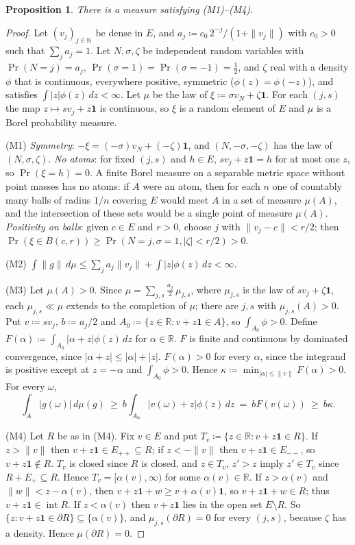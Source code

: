 \documentclass[11pt]{article}
\newtheorem{proposition}[theorem]{Proposition}
\theoremstyle{definition}
\newcommand{\one}{\mathbf 1}
\newcommand{\R}{\mathbb R}
\newcommand{\N}{\mathbb N}
\newcommand{\interior}{\operatorname{int}}
\newcommand{\bd}{\partial}
\begin{document}
\begin{proposition}\label{prop:existence-measure}
There is a measure satisfying (M1)--(M4).
\end{proposition}
\begin{proof}
Let $(v_j)_{j\in\N}$ be dense in $E$, and $a_j\coloneqq c_0\,2^{-j}/(1+\|v_j\|)$ with $c_0>0$ such that $\sum_ja_j=1$. Let $N,\sigma,\zeta$ be independent random variables with $\Pr(N=j)=a_j$, $\Pr(\sigma=1)=\Pr(\sigma=-1)=\tfrac12$, and $\zeta$ real with a density $\phi$ that is continuous, everywhere positive, symmetric ($\phi(z)=\phi(-z)$), and satisfies $\int|z|\phi(z)\,dz<\infty$. Let $\mu$ be the law of $\xi\coloneqq\sigma v_N+\zeta\one$. For each $(j,s)$ the map $z\mapsto sv_j+z\one$ is continuous, so $\xi$ is a random element of $E$ and $\mu$ is a Borel probability measure.

(M1) \emph{Symmetry}: $-\xi=(-\sigma)v_N+(-\zeta)\one$, and $(N,-\sigma,-\zeta)$ has the law of $(N,\sigma,\zeta)$. \emph{No atoms}: for fixed $(j,s)$ and $h\in E$, $sv_j+z\one=h$ for at most one $z$, so $\Pr(\xi=h)=0$. A finite Borel measure on a separable metric space without point masses has no atoms: if $A$ were an atom, then for each $n$ one of countably many balls of radius $1/n$ covering $E$ would meet $A$ in a set of measure $\mu(A)$, and the intersection of these sets would be a single point of measure $\mu(A)$. \emph{Positivity on balls}: given $c\in E$ and $r>0$, choose $j$ with $\|v_j-c\|<r/2$; then $\Pr(\xi\in B(c,r))\ge\Pr(N=j,\sigma=1,|\zeta|<r/2)>0$.

(M2) $\int\|g\|\,d\mu\le\sum_ja_j\|v_j\|+\int|z|\phi(z)\,dz<\infty$.

(M3) Let $\mu(A)>0$. Since $\mu=\sum_{j,s}\tfrac{a_j}2\,\mu_{j,s}$, where $\mu_{j,s}$ is the law of $sv_j+\zeta\one$, each $\mu_{j,s}\ll\mu$ extends to the completion of $\mu$; there are $j,s$ with $\mu_{j,s}(A)>0$. Put $v\coloneqq sv_j$, $b\coloneqq a_j/2$ and $A_0\coloneqq\{z\in\R:v+z\one\in A\}$, so $\int_{A_0}\phi>0$. Define $F(\alpha)\coloneqq\int_{A_0}|\alpha+z|\phi(z)\,dz$ for $\alpha\in\R$. $F$ is finite and continuous by dominated convergence, since $|\alpha+z|\le|\alpha|+|z|$. $F(\alpha)>0$ for every $\alpha$, since the integrand is positive except at $z=-\alpha$ and $\int_{A_0}\phi>0$. Hence $\kappa\coloneqq\min_{|\alpha|\le\|v\|}F(\alpha)>0$. For every $\omega$,
\[
\int_A|g(\omega)|\,d\mu(g)\ \ge\ b\int_{A_0}|v(\omega)+z|\phi(z)\,dz\ =\ bF(v(\omega))\ \ge\ b\kappa.
\]

(M4) Let $R$ be as in (M4). Fix $v\in E$ and put $T_v\coloneqq\{z\in\R:v+z\one\in R\}$. If $z>\|v\|$ then $v+z\one\in E_{++}\subseteq R$; if $z<-\|v\|$ then $v+z\one\in E_{--}$, so $v+z\one\notin R$. $T_v$ is closed since $R$ is closed, and $z\in T_v$, $z'>z$ imply $z'\in T_v$ since $R+E_+\subseteq R$. Hence $T_v=[\alpha(v),\infty)$ for some $\alpha(v)\in\R$. If $z>\alpha(v)$ and $\|w\|<z-\alpha(v)$, then $v+z\one+w\ge v+\alpha(v)\one$, so $v+z\one+w\in R$; thus $v+z\one\in\interior R$. If $z<\alpha(v)$ then $v+z\one$ lies in the open set $E\setminus R$. So $\{z:v+z\one\in\bd R\}\subseteq\{\alpha(v)\}$, and $\mu_{j,s}(\bd R)=0$ for every $(j,s)$, because $\zeta$ has a density. Hence $\mu(\bd R)=0$.
\end{proof}
\end{document}
